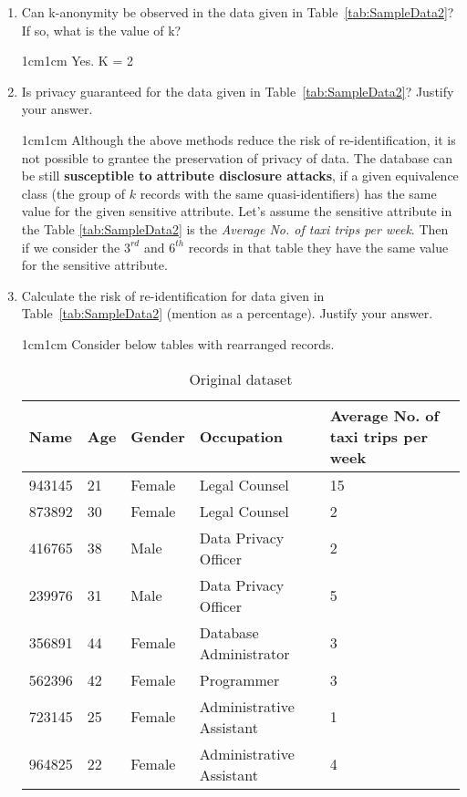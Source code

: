 \documentclass[11pt,letterpaper]{article}
\newenvironment{answer}{\em \color{blue} \begin{adjustwidth}{1cm}{1cm}}{\end{adjustwidth}}
\begin{document}
\begin{enumerate}
		\item Can k-anonymity be observed in the data given in Table~\ref{tab:SampleData2}? If so, what is the value of k?
		
		\begin{answer}
			Yes. K = 2
		\end{answer}
		
		\item Is privacy guaranteed for the data given in Table~\ref{tab:SampleData2}? Justify your answer.
		
		\begin{answer}
			Although the above methods reduce the risk of re-identification, it is not possible to grantee the preservation of privacy of data. The database can be still \textbf{susceptible to attribute disclosure attacks}, if a given equivalence class (the group of $k$ records with the same quasi-identifiers) has the same value for the given sensitive attribute. Let's assume the sensitive attribute in the Table \ref{tab:SampleData2} is the \textit{Average No. of taxi trips per week}. Then if we consider the $3^{rd}$ and $6^{th}$ records in that table they have the same value for the sensitive attribute. 
		\end{answer}
		
		\pagebreak
		\item Calculate the risk of re-identification for data given in Table~\ref{tab:SampleData2} (mention as a percentage). Justify your answer.
		
		\begin{answer}
			Consider below tables with rearranged records.
			
			\begin{table}[h!]
				\caption{Original dataset}
				\begin{tabularx}{\columnwidth}{|p{2cm}|p{2cm}|p{3cm}|X|X|}
					\hline
					\textbf{Name} & \textbf{Age} & \textbf{Gender}  & \textbf{Occupation}  & \textbf{Average No. of taxi trips per week} \\\hline
					943145 & 21 & Female & Legal Counsel & 15\\\hline
					873892 & 30 & Female & Legal Counsel & 2\\ \hline
					\hline
					416765 & 38 & Male & Data Privacy Officer & 2 \\\hline
					239976 & 31 & Male & Data Privacy Officer & 5 \\\hline
					\hline			
					356891 & 44 & Female & Database Administrator & 3 \\ \hline
					562396 & 42 & Female & Programmer & 3\\ \hline
					\hline									
					723145 & 25 & Female & Administrative 
					Assistant & 1\\\hline
					964825 & 22 & Female & Administrative 
					Assistant & 4 \\ \hline																																					
				\end{tabularx}
			\end{table}
			

\end{answer}
\end{enumerate}
\end{document}
